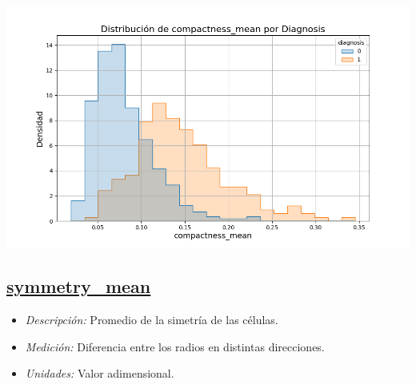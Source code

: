 \documentclass[a4paper, 12pt]{article}
\begin{document}
\includegraphics[width=\textwidth]{../Plots/plots_diagnosis/distribucion_compactness_mean_por_diagnosis.png}

\subsection*{\underline{symmetry\_mean}}
    \begin{itemize}
	\item \textit{Descripción:} Promedio de la simetría de las células.
	\item \textit{Medición:} Diferencia entre los radios en distintas direcciones.
	\item \textit{Unidades:} Valor adimensional.
\end{itemize}
\end{document}
